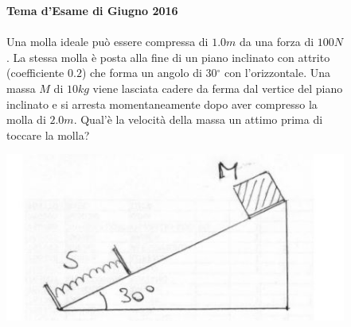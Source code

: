 \begin{figure}[h!]
{{            }
        }                  
    \end{figure}
    
    \begin{figure}[h!]
    \textbf{Tema d'Esame di Giugno 2016}\\ \\
    Una molla ideale può essere compressa di $1.0 m$ da una forza di $100 N$. La stessa molla è posta alla fine di un piano inclinato con attrito (coefficiente $0.2$) che forma un angolo di 30$^{\circ}$ con l'orizzontale. Una massa $M$ di $10 kg$ viene lasciata cadere da ferma dal vertice del piano inclinato e si arresta momentaneamente dopo aver compresso la molla di $2.0 m$. Qual'è la velocità della massa un attimo prima di toccare la molla? 
    \\
        \begin{center}
            \includegraphics[scale=0.5]{ES2/GIU022016.jpg}
        \end{center}
        

\end{figure}
